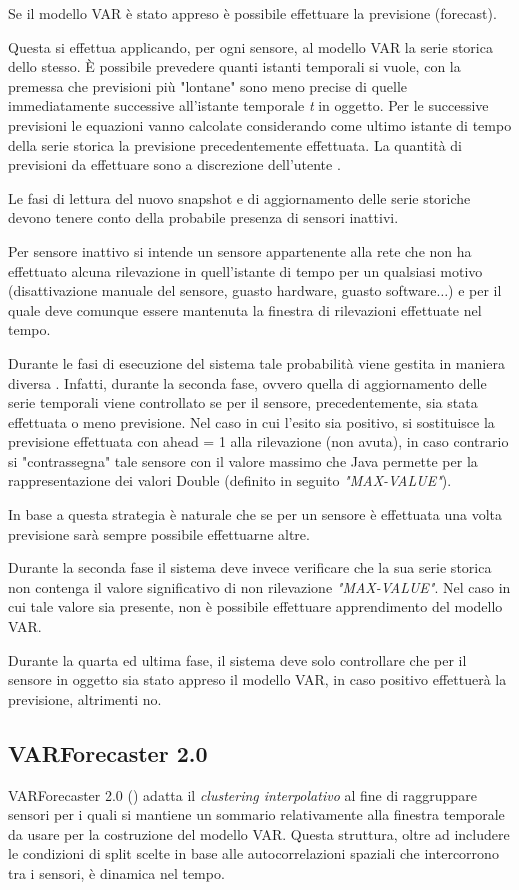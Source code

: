 \documentclass[12pt,a4paper,oneside,openright]{book}
\begin{document}
Se il modello VAR è stato appreso è possibile effettuare la previsione (forecast).

Questa si effettua applicando, per ogni sensore, al modello VAR la serie storica dello stesso. È possibile prevedere quanti istanti temporali si vuole, con la premessa che previsioni più "lontane" sono meno precise di quelle immediatamente successive all'istante temporale \textit{t} in oggetto. Per le successive previsioni le equazioni vanno calcolate considerando come ultimo istante di tempo della serie storica la previsione precedentemente effettuata. La quantità di previsioni da effettuare sono a discrezione dell'utente \cite{donato}.

Le fasi di lettura del nuovo snapshot e di aggiornamento delle serie storiche devono tenere conto della probabile presenza di sensori inattivi. 

Per sensore inattivo \cite{donato} si intende un sensore appartenente alla rete che non ha effettuato alcuna rilevazione in quell'istante di tempo per un qualsiasi motivo (disattivazione manuale del sensore, guasto hardware, guasto software$\dots$) e per il quale deve comunque essere mantenuta la finestra di rilevazioni effettuate nel tempo. 

Durante le fasi di esecuzione del sistema tale probabilità viene gestita in maniera diversa \cite{donato}. Infatti, durante la seconda fase, ovvero quella di aggiornamento delle serie temporali viene controllato se per il sensore, precedentemente, sia stata effettuata o meno previsione. Nel caso in cui l'esito sia positivo, si sostituisce la previsione effettuata con ahead = 1 alla rilevazione (non avuta), in caso contrario si "contrassegna" tale sensore con il valore massimo che Java permette per la rappresentazione dei valori Double (definito in seguito \textit{"MAX-VALUE"}). 

In base a questa strategia è naturale che se per un sensore è effettuata una volta previsione sarà sempre possibile effettuarne altre. 

Durante la seconda fase il sistema deve invece verificare che la sua serie storica non contenga il valore significativo di non rilevazione \textit{"MAX-VALUE"}. Nel caso in cui tale valore sia presente, non è possibile effettuare apprendimento del modello VAR. 

Durante la quarta ed ultima fase, il sistema deve solo controllare che per il sensore in oggetto sia stato appreso il modello VAR, in caso positivo effettuerà la previsione, altrimenti no.
\subsection{VARForecaster 2.0}
VARForecaster 2.0 (\cite{donato}) adatta il \textit{clustering interpolativo} al fine di raggruppare sensori per i quali si mantiene un sommario relativamente alla finestra temporale da usare per la costruzione del modello VAR. Questa struttura, oltre ad includere le condizioni di split scelte in base alle autocorrelazioni spaziali che intercorrono tra i sensori, è dinamica nel tempo. 
\end{document}
